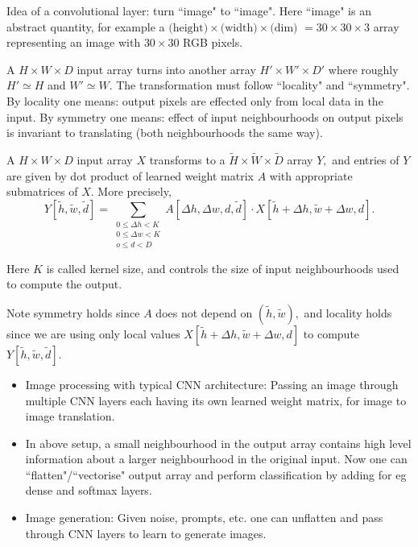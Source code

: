  Idea of a convolutional layer: turn ``image" to ``image". Here ``image" is an abstract quantity, for example a ${ \text{(height)} \times \text{(width)} \times \text{(dim)} }$ ${ = 30 \times 30 \times 3 }$ array representing an image with ${ 30 \times 30 }$ RGB pixels. 

A ${ H \times W \times D }$ input array turns into another array ${ H' \times W' \times D' }$ where roughly ${ H' \simeq H }$ and ${ W' \simeq W }.$ The transformation must follow ``locality" and ``symmetry". By locality one means: output pixels are effected only from local data in the input. By symmetry one means: effect of input neighbourhoods on output pixels is invariant to translating (both neighbourhoods the same way). 

A ${ H \times W \times D }$ input array ${ X }$ transforms to a ${ \tilde{H} \times \tilde{W} \times \tilde{D} }$ array ${ Y },$ and entries of ${ Y }$ are given by dot product of learned weight matrix ${ A }$ with appropriate submatrices of ${ X }.$  More precisely, $${ Y[\tilde{h}, \tilde{w}, \tilde{d}] = \sum _{\substack{0 \leq \Delta h < K \\ 0 \leq \Delta w < K \\ o \leq d < D}} A[\Delta h, \Delta w, d, \tilde{d}] \cdot X[\tilde{h} + \Delta h, \tilde{w} + \Delta w, d]  .}$$ 

Here ${ K }$ is called kernel size, and controls the size of input neighbourhoods used to compute the output. 

Note symmetry holds since ${ A }$ does not depend on ${ (\tilde{h}, \tilde{w}) },$ and locality holds since we are using only local values ${ X[\tilde{h} + \Delta h, \tilde{w} + \Delta w, d] }$ to compute ${ Y[\tilde{h}, \tilde{w}, \tilde{d}] }.$

\begin{itemize}
\item Image processing with typical CNN architecture: Passing an image through multiple CNN layers each having its own learned weight matrix, for image to image translation. 
\item In above setup, a small neighbourhood in the output array contains high level information about a larger neighbourhood in the original input. Now one can  ``flatten"/``vectorise" output array and perform classification by adding for eg dense and softmax layers.
\item Image generation: Given noise, prompts, etc. one can unflatten and pass through CNN layers to learn to generate images. 
\end{itemize} 

